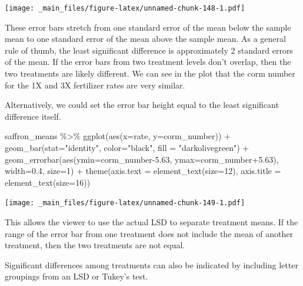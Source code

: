 \documentclass[
]{book}
\newenvironment{Shaded}{\begin{snugshade}}{\end{snugshade}}
\newcommand{\AttributeTok}[1]{\textcolor[rgb]{0.77,0.63,0.00}{#1}}
\newcommand{\DecValTok}[1]{\textcolor[rgb]{0.00,0.00,0.81}{#1}}
\newcommand{\FloatTok}[1]{\textcolor[rgb]{0.00,0.00,0.81}{#1}}
\newcommand{\FunctionTok}[1]{\textcolor[rgb]{0.00,0.00,0.00}{#1}}
\newcommand{\NormalTok}[1]{#1}
\newcommand{\SpecialCharTok}[1]{\textcolor[rgb]{0.00,0.00,0.00}{#1}}
\newcommand{\StringTok}[1]{\textcolor[rgb]{0.31,0.60,0.02}{#1}}
\begin{document}
\texttt{[image: \_main\_files/figure-latex/unnamed-chunk-148-1.pdf]}

These error bars stretch from one standard error of the mean below the sample mean to one standard error of the mean above the sample mean. As a general rule of thumb, the least significant difference is approximately 2 standard errors of the mean. If the error bars from two treatment levels don't overlap, then the two treatments are likely different. We can see in the plot that the corm number for the 1X and 3X fertilizer rates are very similar.

Alternatively, we could set the error bar height equal to the least significant difference itself.

\begin{Shaded}
\begin{Highlighting}[]
\NormalTok{saffron\_means }\SpecialCharTok{\%\textgreater{}\%}
  \FunctionTok{ggplot}\NormalTok{(}\FunctionTok{aes}\NormalTok{(}\AttributeTok{x=}\NormalTok{rate, }\AttributeTok{y=}\NormalTok{corm\_number)) }\SpecialCharTok{+}
  \FunctionTok{geom\_bar}\NormalTok{(}\AttributeTok{stat=}\StringTok{"identity"}\NormalTok{, }\AttributeTok{color=}\StringTok{"black"}\NormalTok{, }\AttributeTok{fill =} \StringTok{"darkolivegreen"}\NormalTok{) }\SpecialCharTok{+}
  \FunctionTok{geom\_errorbar}\NormalTok{(}\FunctionTok{aes}\NormalTok{(}\AttributeTok{ymin=}\NormalTok{corm\_number}\FloatTok{{-}5.63}\NormalTok{, }\AttributeTok{ymax=}\NormalTok{corm\_number}\FloatTok{+5.63}\NormalTok{), }\AttributeTok{width=}\FloatTok{0.4}\NormalTok{, }\AttributeTok{size=}\DecValTok{1}\NormalTok{) }\SpecialCharTok{+}
  \FunctionTok{theme}\NormalTok{(}\AttributeTok{axis.text =} \FunctionTok{element\_text}\NormalTok{(}\AttributeTok{size=}\DecValTok{12}\NormalTok{),}
        \AttributeTok{axis.title =} \FunctionTok{element\_text}\NormalTok{(}\AttributeTok{size=}\DecValTok{16}\NormalTok{))}
\end{Highlighting}
\end{Shaded}

\texttt{[image: \_main\_files/figure-latex/unnamed-chunk-149-1.pdf]}

This allows the viewer to use the actual LSD to separate treatment means. If the range of the error bar from one treatment does not include the mean of another treatment, then the two treatments are not equal.

Significant differences among treatments can also be indicated by including letter groupings from an LSD or Tukey's test.
\end{document}
